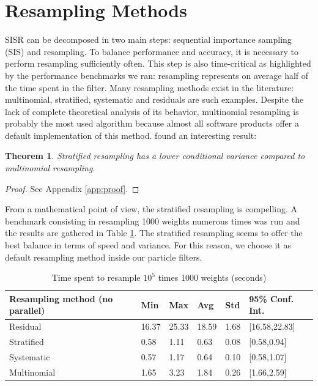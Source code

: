 \documentclass[11pt,a4,twosided,singlespacing,titlepagenumber=on]{scrreprt}
\numberwithin{equation}{chapter} %
\newtheorem{theorem}{Theorem}%
\theoremstyle{remark}
\begin{document}
\section{Resampling Methods}
SISR can be decomposed in two main steps: sequential importance sampling (SIS) and resampling. To balance performance and accuracy, it is necessary to perform resampling sufficiently often. This step is also time-critical as highlighted by the performance benchmarks we ran: resampling represents on average half of the time spent in the filter. Many resampling methods exist in the literature: multinomial, stratified, systematic and residuals are such examples. Despite the lack of complete theoretical analysis of its behavior, multinomial resampling is probably the most used algorithm because almost all software products offer a default implementation of this method. \cite{douc2005} found an interesting result:
\begin{theorem}
\textit{
Stratified resampling has a lower conditional variance compared to multinomial resampling.
}
\end{theorem}
\begin{proof}
See Appendix \ref{app:proof}.
\end{proof}

From a mathematical point of view, the stratified resampling is compelling. A benchmark consisting in resampling 1000 weights numerous times was run and the results are gathered in Table \ref{resampling_method_table}. The stratified resampling seems to offer the best balance in terms of speed and variance. For this reason, we choose it as default resampling method inside our particle filters.

\begin{table}[H]
\centering
\begin{tabular}{llllll}
\hline
\multicolumn{1}{|l|}{Resampling method (no parallel)}     & \multicolumn{1}{l|}{Min} & \multicolumn{1}{l|}{Max} & \multicolumn{1}{l|}{Avg} & \multicolumn{1}{l|}{Std} & \multicolumn{1}{l|}{95\% Conf. Int.}\\ \hline
Residual 					   &  16.37 & 25.33 & 18.59 & 1.68 & [16.58,22.83]\\
Stratified   				 &  0.58  & 1.11  & 0.63  & 0.08 & [0.58,0.94]\\
Systematic   				 &  0.57  & 1.17  & 0.64  & 0.10 & [0.58,1.07]\\
Multinomial          &  1.65  & 3.23  & 1.84  & 0.26 & [1.66,2.59]\\
\hline
\end{tabular}
\caption{Time spent to resample $10^5$ times 1000 weights (seconds)}
\label{resampling_method_table}
\end{table}
\end{document}

